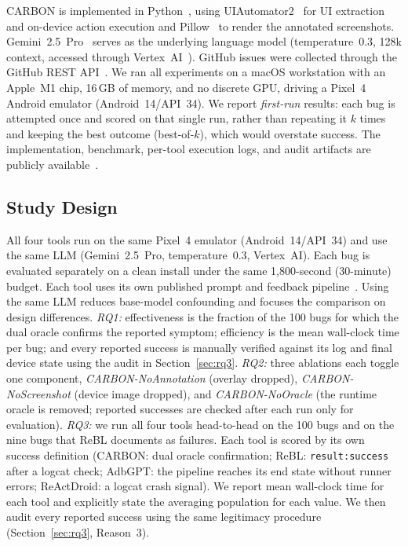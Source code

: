 \documentclass[10pt,conference,a4paper]{IEEEtran}
\begin{document}
  CARBON is implemented in Python~\cite{python}, using
  UIAutomator2~\cite{uiautomator2,androidmanual} for UI extraction and
  on-device action execution and Pillow~\cite{pillow} to render the
  annotated screenshots. Gemini~2.5~Pro~\cite{gemini25pro} serves as the
  underlying language model (temperature~0.3, 128k context, accessed
  through Vertex~AI~\cite{vertexai}). GitHub issues were collected through the
  GitHub REST API~\cite{githubapi}. We ran all experiments on a macOS
  workstation with an Apple~M1 chip, 16\,GB of memory, and no discrete
  GPU, driving a Pixel~4 Android emulator (Android~14/API~34). We report
  \emph{first-run} results: each bug is attempted once and scored on that
  single run, rather than repeating it $k$ times and keeping the best
  outcome (best-of-$k$), which would overstate success. The implementation,
  benchmark, per-tool execution logs, and audit artifacts are publicly
  available~\cite{carbon}.

  \subsection{Study Design}
  \label{sec:study-design}
  All four tools run on the same Pixel~4 emulator (Android~14/API~34)
  and use the same LLM (Gemini~2.5~Pro, temperature~0.3, Vertex~AI).
  Each bug is evaluated separately on a clean install under the same
  1{,}800-second (30-minute) budget. Each tool uses its own published prompt
  and feedback pipeline~\cite{rebl,reactdroid,adbgpt}. Using the same LLM reduces base-model confounding and focuses the comparison on design differences. \emph{RQ1:}
  effectiveness is the fraction of the 100 bugs for which the dual oracle
  confirms the reported symptom; efficiency is the mean wall-clock time
  per bug; and every reported success is manually verified against its
  log and final device state using the audit in Section~\ref{sec:rq3}. \emph{RQ2:} three ablations each
  toggle one component, \emph{CARBON-NoAnnotation} (overlay dropped),
  \emph{CARBON-NoScreenshot} (device image dropped), and
  \emph{CARBON-NoOracle} (the runtime oracle is removed; reported successes
  are checked after each run only for evaluation). \emph{RQ3:} we run all four
  tools head-to-head on the 100 bugs and on the nine bugs that ReBL
  documents as failures. Each tool is scored by its own success definition (CARBON: dual
  oracle confirmation; ReBL: \texttt{result:success} after a logcat check;
  AdbGPT: the pipeline reaches its end state without runner errors;
  ReActDroid: a logcat crash signal). We report mean wall-clock time for
  each tool and explicitly state the averaging population for each value.
  We then audit every reported success using the same legitimacy procedure
  (Section~\ref{sec:rq3}, Reason~3).
\end{document}
